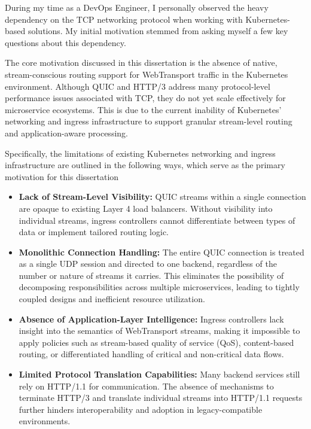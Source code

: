 During my time as a DevOps Engineer, I personally observed the heavy dependency on the TCP networking protocol when working with Kubernetes-based solutions. My initial motivation stemmed from asking myself a few key questions about this dependency.

The core motivation discussed in this dissertation is the absence of native, stream-conscious routing support for WebTransport traffic in the Kubernetes environment. Although QUIC and HTTP/3 address many protocol-level performance issues associated with TCP, they do not yet scale effectively for microservice ecosystems. This is due to the current inability of Kubernetes’ networking and ingress infrastructure to support granular stream-level routing and application-aware processing.

Specifically, the limitations of existing Kubernetes networking and ingress infrastructure are outlined in the following ways, which serve as the primary motivation for this dissertation

\begin{itemize}
\item \textbf{Lack of Stream-Level Visibility:} QUIC streams within a single connection are opaque to existing Layer 4 load balancers. Without visibility into individual streams, ingress controllers cannot differentiate between types of data or implement tailored routing logic.

\item \textbf{Monolithic Connection Handling:} The entire QUIC connection is treated as a single UDP session and directed to one backend, regardless of the number or nature of streams it carries. This eliminates the possibility of decomposing responsibilities across multiple microservices, leading to tightly coupled designs and inefficient resource utilization.

\item \textbf{Absence of Application-Layer Intelligence:} Ingress controllers lack insight into the semantics of WebTransport streams, making it impossible to apply policies such as stream-based quality of service (QoS), content-based routing, or differentiated handling of critical and non-critical data flows.

\item \textbf{Limited Protocol Translation Capabilities:} Many backend services still rely on HTTP/1.1 for communication. The absence of mechanisms to terminate HTTP/3 and translate individual streams into HTTP/1.1 requests further hinders interoperability and adoption in legacy-compatible environments.


\end{itemize}

